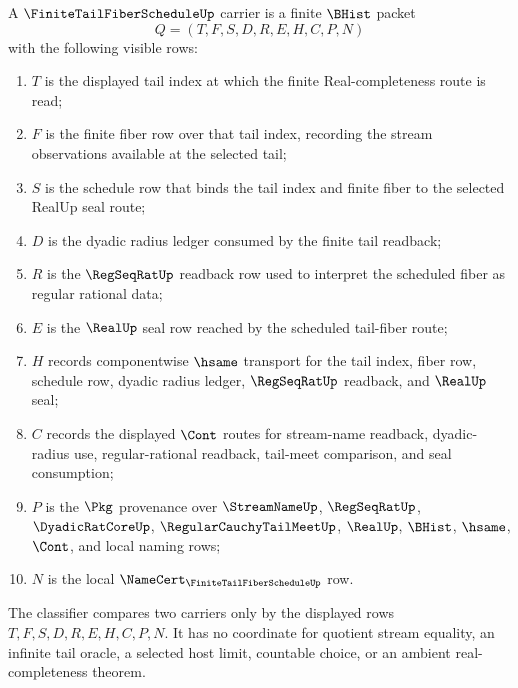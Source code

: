 \begin{definition}
\label{def:finite-tail-fiber-schedule-carrier}
A $\FiniteTailFiberScheduleUp$ carrier is a finite $\BHist$ packet
$$
Q=(T,F,S,D,R,E,H,C,P,N)
$$
with the following visible rows:
\begin{enumerate}
\item $T$ is the displayed tail index at which the finite Real-completeness route is read;
\item $F$ is the finite fiber row over that tail index, recording the stream observations available at the selected tail;
\item $S$ is the schedule row that binds the tail index and finite fiber to the selected RealUp seal route;
\item $D$ is the dyadic radius ledger consumed by the finite tail readback;
\item $R$ is the $\RegSeqRatUp$ readback row used to interpret the scheduled fiber as regular rational data;
\item $E$ is the $\RealUp$ seal row reached by the scheduled tail-fiber route;
\item $H$ records componentwise $\hsame$ transport for the tail index, fiber row, schedule row, dyadic radius ledger, $\RegSeqRatUp$ readback, and $\RealUp$ seal;
\item $C$ records the displayed $\Cont$ routes for stream-name readback, dyadic-radius use, regular-rational readback, tail-meet comparison, and seal consumption;
\item $P$ is the $\Pkg$ provenance over $\StreamNameUp$, $\RegSeqRatUp$, $\DyadicRatCoreUp$, $\RegularCauchyTailMeetUp$, $\RealUp$, $\BHist$, $\hsame$, $\Cont$, and local naming rows;
\item $N$ is the local $\NameCert_{\FiniteTailFiberScheduleUp}$ row.
\end{enumerate}
The classifier compares two carriers only by the displayed rows $T,F,S,D,R,E,H,C,P,N$. It has no coordinate for quotient stream equality, an infinite tail oracle, a selected host limit, countable choice, or an ambient real-completeness theorem.
\end{definition}

